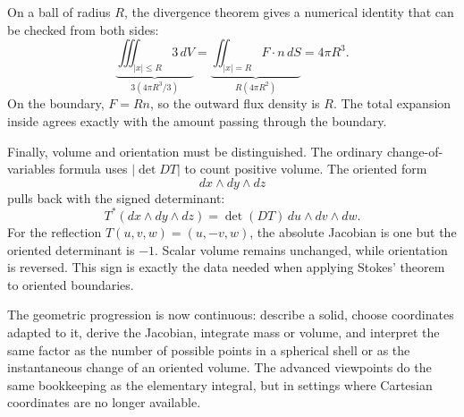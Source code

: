 On a ball of radius \(R\), the divergence theorem gives a numerical identity that can be checked from both sides:
\[
 \underbrace{\iiint_{|x|\le R}3\,dV}_{3(4\pi R^3/3)}
 =
 \underbrace{\iint_{|x|=R}F\cdot n\,dS}_{R(4\pi R^2)}
 =4\pi R^3.
\]
On the boundary, \(F=Rn\), so the outward flux density is \(R\). The total expansion inside agrees exactly with the amount passing through the boundary.

Finally, volume and orientation must be distinguished. The ordinary change-of-variables formula uses \(|\det DT|\) to count positive volume. The oriented form
\[
 dx\wedge dy\wedge dz
\]
pulls back with the signed determinant:
\[
 T^*(dx\wedge dy\wedge dz)
 =\det(DT)\,du\wedge dv\wedge dw.
\]
For the reflection \(T(u,v,w)=(u,-v,w)\), the absolute Jacobian is one but the oriented determinant is \(-1\). Scalar volume remains unchanged, while orientation is reversed. This sign is exactly the data needed when applying Stokes' theorem to oriented boundaries.

The geometric progression is now continuous: describe a solid, choose coordinates adapted to it, derive the Jacobian, integrate mass or volume, and interpret the same factor as the number of possible points in a spherical shell or as the instantaneous change of an oriented volume. The advanced viewpoints do the same bookkeeping as the elementary integral, but in settings where Cartesian coordinates are no longer available.
